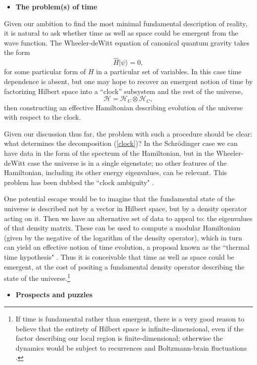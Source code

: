 \documentclass[12pt,english]{article}
\newcommand{\be}{\begin{equation}}
\newcommand{\ee}{\end{equation}}
\newcommand{\HH}{\mathcal{H}}
\begin{document}
\newpage

\begin{itemize}
\item \textbf{The problem(s) of time}
\end{itemize}

Given our ambition to find the most minimal fundamental description of reality, it is natural to ask whether time as well as space could be emergent from the wave function.
The Wheeler-deWitt equation of canonical quantum gravity takes the form
\be
  \hat{H}|\psi\rangle = 0,
\ee
for some particular form of $\hat H$ in a particular set of variables.
In this case time dependence is absent, but one may hope to recover an emergent notion of time by factorizing Hilbert space into a ``clock'' subsystem and the rest of the universe, 
\be
  \HH = \HH_U \otimes \HH_C,
  \label{clock}
\ee
then constructing an effective Hamiltonian describing evolution of the universe with respect to the clock.

Given our discussion thus far, the problem with such a procedure should be clear: what determines the decomposition (\ref{clock})?
In the Schr\"odinger case we can have data in the form of the spectrum of the Hamiltonian, but in the Wheeler-deWitt case the universe is in a single eigenstate; no other features of the Hamiltonian, including its other energy eigenvalues, can be relevant.
This problem has been dubbed the ``clock ambiguity" \cite{Albrecht:2007mm}.

One potential escape would be to imagine that the fundamental state of the universe is described not by a vector in Hilbert space, but by a density operator acting on it.
Then we have an alternative set of data to appeal to: the eigenvalues of that density matrix.
These can be used to compute a modular Hamiltonian (given by the negative of the logarithm of the density operator), which in turn can yield an effective notion of time evolution, a proposal known as the ``thermal time hypothesis" \cite{Connes:1994hv}.
Thus it is conceivable that time as well as space could be emergent, at the cost of positing a fundamental density operator describing the state of the universe.\footnote{If time is fundamental rather than emergent, there is a very good reason to believe that the entirety of Hilbert space is infinite-dimensional, even if the factor describing our local region is finite-dimensional; otherwise the dynamics would be subject to recurrences and Boltzmann-brain fluctuations \cite{Carroll:2008yd}.}


\begin{itemize}
\item \textbf{Prospects and puzzles}
\end{itemize}
\end{document}
